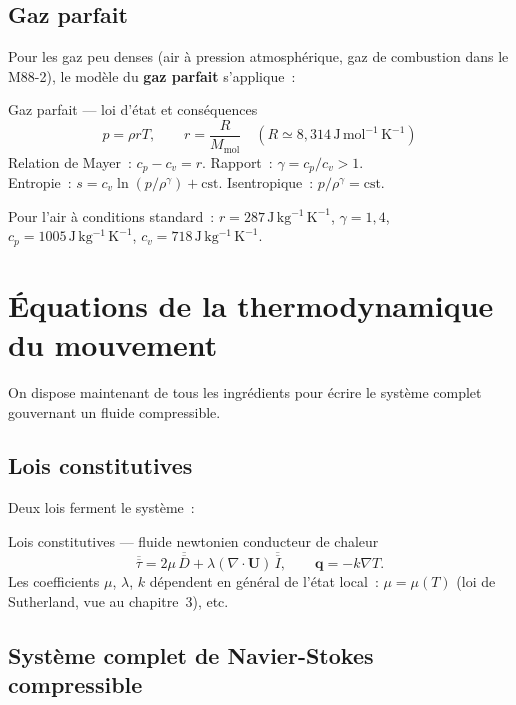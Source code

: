 \documentclass[11pt,a4paper]{report}
\newcommand{\ten}[1]{\overline{\overline{#1}}}   %
\begin{document}
\subsection{Gaz parfait}

Pour les gaz peu denses (air \`a pression atmosph\'erique, gaz de combustion dans le
M88-2), le mod\`ele du \textbf{gaz parfait} s'applique~:

\begin{importantbox}{Gaz parfait --- loi d'\'etat et cons\'equences}
\[
  p = \rho r T,
  \qquad r = \frac{R}{M_{\mathrm{mol}}} \quad
  (R \simeq 8{,}314\,\mathrm{J\,mol^{-1}\,K^{-1}})
\]
Relation de Mayer~: $c_p - c_v = r$. \quad
Rapport~: $\gamma = c_p/c_v > 1$. \\
Entropie~: $s = c_v \ln(p/\rho^\gamma) + \mathrm{cst}$. \quad
Isentropique~: $p/\rho^\gamma = \mathrm{cst}$.
\end{importantbox}

Pour l'air \`a conditions standard~: $r = 287\,\mathrm{J\,kg^{-1}\,K^{-1}}$,
$\gamma = 1{,}4$, $c_p = 1005\,\mathrm{J\,kg^{-1}\,K^{-1}}$,
$c_v = 718\,\mathrm{J\,kg^{-1}\,K^{-1}}$.

\section{\'Equations de la thermodynamique du mouvement}

On dispose maintenant de tous les ingr\'edients pour \'ecrire le syst\`eme complet
gouvernant un fluide compressible.

\subsection{Lois constitutives}

Deux lois ferment le syst\`eme~:

\begin{defbox}{Lois constitutives --- fluide newtonien conducteur de chaleur}
\[
  \ten{\tau} = 2\mu\,\ten{D} + \lambda(\nabla\cdot\bm{U})\,\ten{I},
  \qquad
  \bm{q} = -k\nabla T.
\]
Les coefficients $\mu$, $\lambda$, $k$ d\'ependent en g\'en\'eral de l'\'etat local~:
$\mu = \mu(T)$ (loi de Sutherland, vue au chapitre~3), etc.
\end{defbox}

\subsection{Syst\`eme complet de Navier-Stokes compressible}
\end{document}
